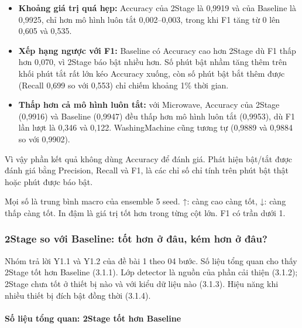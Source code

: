 \begin{itemize}
\item \textbf{Khoảng giá trị quá hẹp:} Accuracy của 2Stage là 0,9919 và của Baseline là 0,9925, chỉ hơn mô hình luôn tắt 0,002–0,003, trong khi F1 tăng từ 0 lên 0,605 và 0,535.
\item \textbf{Xếp hạng ngược với F1:} Baseline có Accuracy cao hơn 2Stage dù F1 thấp hơn 0,070, vì 2Stage báo bật nhiều hơn. Số phút bật nhầm tăng thêm trên khối phút tắt rất lớn kéo Accuracy xuống, còn số phút bật bắt thêm được (Recall 0,699 so với 0,553) chỉ chiếm khoảng 1\% thời gian.
\item \textbf{Thấp hơn cả mô hình luôn tắt:} với Microwave, Accuracy của 2Stage (0,9916) và Baseline (0,9947) đều thấp hơn mô hình luôn tắt (0,9953), dù F1 lần lượt là 0,346 và 0,122. WashingMachine cũng tương tự (0,9889 và 0,9884 so với 0,9902).
\end{itemize}

Vì vậy phần kết quả không dùng Accuracy để đánh giá. Phát hiện bật/tắt được đánh giá bằng Precision, Recall và F1, là các chỉ số chỉ tính trên phút bật thật hoặc phút được báo bật.

Mọi số là trung bình macro của ensemble 5 seed. ↑: càng cao càng tốt, ↓: càng thấp càng tốt. In đậm là giá trị tốt hơn trong từng cột lớn. F1 có trần dưới 1.

\subsubsection{2Stage so với Baseline: tốt hơn ở đâu, kém hơn ở đâu?}

Nhóm trả lời Y1.1 và Y1.2 của đề bài 1 theo 04 bước. Số liệu tổng quan cho thấy 2Stage tốt hơn Baseline (3.1.1). Lớp detector là nguồn của phần cải thiện (3.1.2); 2Stage chưa tốt ở thiết bị nào và với kiểu dữ liệu nào (3.1.3). Hiệu năng khi nhiều thiết bị đích bật đồng thời (3.1.4).

\paragraph{Số liệu tổng quan: 2Stage tốt hơn Baseline}


